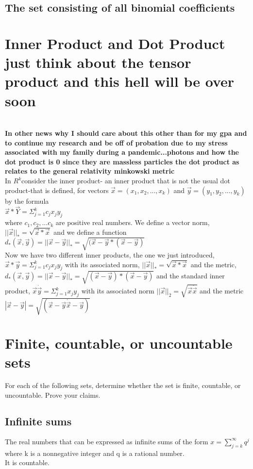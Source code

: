 \subsection*{The set consisting of all binomial coefficients}

\section*{Inner Product and Dot Product just think about the tensor product and this hell will be over soon}\\ 
\textbf{In other news why I should care about this other than for my gpa and to continue my research and be off of probation due to my stress associated with my family during a pandemic...photons and how the dot product is 0 since they are massless particles the dot product as relates to the general relativity minkowski metric }\\
In $R^k$consider the inner product- an inner product that is not the usual dot product-that is defined, for vectors $\Vec{x}=(x_1,x_2,...,x_k)$ and $\Vec{y}=(y_1,y_2, ..., y_k)$ by the formula \\ 
$\Vec{x} * \Vec{Y}= \Sigma_{j=1}^{k}c_j x_j y_j$ \\ 
where $c_1, c_2, ... c_k$ are positive real numbers. We define a vector norm, $||\Vec{x}||_{*}=\sqrt{\Vec{x}*\Vec{x}}$ and we define a function $d_*(\Vec{x}, \Vec{y})=||\Vec{x}-\Vec{y}||_*=\sqrt{(\Vec{x}-\Vec{y}*(\Vec{x}-\Vec{y})}$ \\ 
Now we have two different inner products, the one we just introduced, $\Vec{x}*\Vec{y}=\Sigma_{j=1}^k c_{j}x_{j}y_{j}$ with its associated norm, $||\Vec{x}||_*=\sqrt{\Vec{x}*\Vec{x}}$ and the metric, $d_{*}(\Vec{x},\Vec{y})=||\Vec{x}-\Vec{y}||_{*}=\sqrt{(\Vec{x}-\Vec{y})*(\Vec{x}-\Vec{y})}$ and the standard inner product, $\Vec{x}\dot\Vec{y}=\Sigma_{j=1}^{k}x_jy_j$ with its associated norm $||\Vec{x}||_2 = \sqrt{\Vec{x}\dot \Vec{x}}$ and the metric $|\Vec{x}-\Vec{y}|=\sqrt{(\Vec{x}-\Vec{y}\dot \Vec{x}-\Vec{y})}$ \\ 



\section{Finite, countable, or uncountable sets}
For each of the following sets, determine whether the set is finite, countable, or uncountable. Prove your claims. \\ 
\subsection{Infinite sums}
The real numbers that can be expressed as infinite sums of the form $x= \sum_{j=k}^\infty q^{j}$ where k is a nonnegative integer and q is a rational number. 
\\ 
It is countable.
